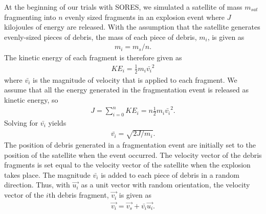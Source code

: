 \documentclass[12pt]{scrartcl}
\begin{document}
At the beginning of our trials with SORES, we simulated a satellite of mass $m_{sat}$ fragmenting into $n$ evenly sized fragments in an explosion event where $J$ kilojoules of energy are released. With the assumption that the satellite generates evenly-sized pieces of debris, the mass of each piece of debris, $m_{i}$, is given as
\begin{align}
m_{i} = m_{s} / n.
\end{align}
The kinetic energy of each fragment is therefore given as
\begin{align}
\mathit{\mathit{KE}}_{i} = \frac{1}{2}m_{i}\bar{v_{i}}^2
\end{align}
where $\bar{v_{i}}$ is the magnitude of velocity that is applied to each fragment. We assume that all the energy generated in the fragmentation event is released as kinetic energy, so
\begin{align}
J = \sum_{i = 0}^{n} \mathit{\mathit{KE}}_{i} = n \frac{1}{2} m_{i}\bar{v_{i}}^2.
\end{align}
Solving for $\bar{v_{i}}$ yields
\begin{align}
\bar{v_{i}} = \sqrt{2 J / m_{i}}.
\end{align}
The position of debris generated in a fragmentation event are initially set to the position of the satellite when the event occurred. The velocity vector of the debris fragments is set equal to the velocity vector of the satellite when the explosion takes place. The magnitude $\bar{v_{i}}$ is added to each piece of debris in a random direction. Thus, with $\vec{u_{i}}$ as a unit vector with random orientation, the velocity vector of the $i$th debris fragment, $\vec{v_i}$ is given as
\begin{align}
\vec{v_{i}} = \vec{v_{s}} + \bar{v_{i}} \vec{u_i}.
\end{align}
\end{document}

